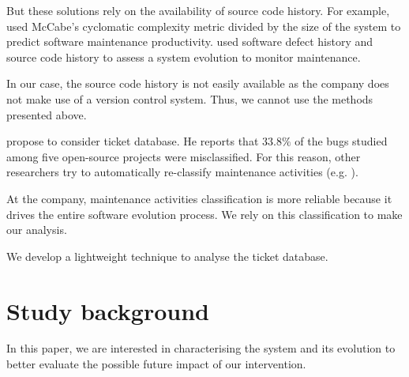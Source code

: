 \documentclass[10pt,conference]{IEEEtran}
\begin{document}

But these solutions rely on the availability of source code history. 
For example, \citep*{gill91} used McCabe’s cyclomatic complexity metric divided by the size of the system to predict software maintenance productivity.
\citep*{port18,Zhan10a} used software defect history and source code history to assess a system evolution to monitor maintenance. 

In our case, the source code history is not easily available as the company does not make use of a version control system.
Thus, we cannot use the methods presented above.

\citep*{Herz13a} propose to consider ticket database.
He reports that $33.8\%$ of the bugs studied among five open-source projects were misclassified.
For this reason, other researchers try to automatically re-classify maintenance activities (e.g. \citep*{Mock20a,Levin19a}).
 
At the company, maintenance activities classification is more reliable because it drives the entire software evolution process.
We rely on this classification to make our analysis.

We develop a lightweight technique to analyse the ticket database.


\section{Study background}
\label{sec:background}

In this paper, we are interested in characterising the system and its evolution to better evaluate the possible future impact of our intervention. 
\end{document}
